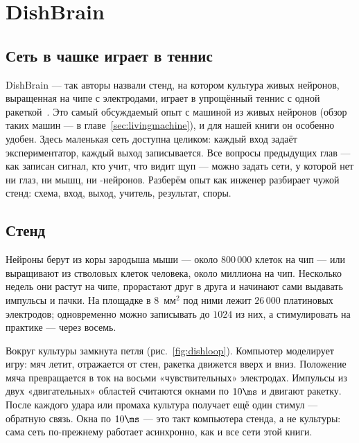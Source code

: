 \chapter{DishBrain}
\label{sec:dishbrain}

\section{Сеть в чашке играет в теннис}

DishBrain --- так авторы назвали стенд, на котором культура живых нейронов, выращенная на чипе с электродами, играет в упрощённый теннис с одной ракеткой~\cite{Kagan2022}. Это самый обсуждаемый опыт с машиной из живых нейронов (обзор таких машин --- в главе~\ref{sec:livingmachine}), и для нашей книги он особенно удобен. Здесь маленькая сеть доступна целиком: каждый вход задаёт экспериментатор, каждый выход записывается. Все вопросы предыдущих глав --- как записан сигнал, кто учит, что видит щуп --- можно задать сети, у которой нет ни глаз, ни мышц, ни -нейронов. Разберём опыт как инженер разбирает чужой стенд: схема, вход, выход, учитель, результат, споры.

\section{Стенд}

Нейроны берут из коры зародыша мыши --- около $800\,000$ клеток на чип --- или выращивают из стволовых клеток человека, около миллиона на чип. Несколько недель они растут на чипе, прорастают друг в друга и начинают сами выдавать импульсы и пачки. На площадке в $8$~мм$^2$ под ними лежит $26\,000$ платиновых электродов; одновременно можно записывать до $1024$ из них, а стимулировать на практике --- через восемь.

Вокруг культуры замкнута петля (рис.~\ref{fig:dishloop}). Компьютер моделирует игру: мяч летит, отражается от стен, ракетка движется вверх и вниз. Положение мяча превращается в ток на восьми «чувствительных» электродах. Импульсы из двух «двигательных» областей считаются окнами по $10\ms$ и двигают ракетку. После каждого удара или промаха культура получает ещё один стимул --- обратную связь. Окна по $10\ms$ --- это такт компьютера стенда, а не культуры: сама сеть по-прежнему работает асинхронно, как и все сети этой книги.

